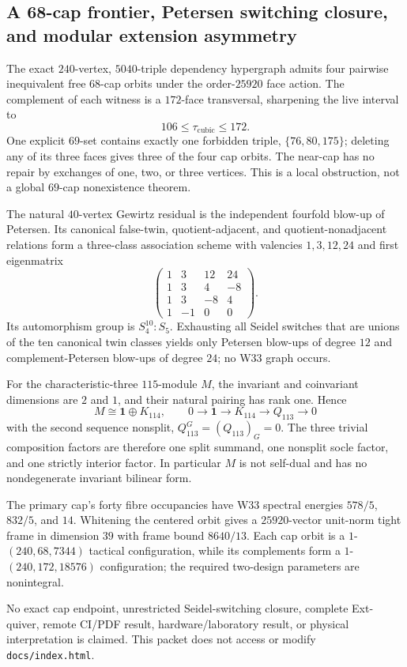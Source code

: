 \subsection{A 68-cap frontier, Petersen switching closure, and modular extension asymmetry}
\label{sec:bt3921-3936}

The exact $240$-vertex, $5040$-triple dependency hypergraph admits four pairwise inequivalent free $68$-cap orbits under the order-$25920$ face action.  The complement of each witness is a $172$-face transversal, sharpening the live interval to
\[
106\leq\tau_{\mathrm{cubic}}\leq172.
\]
One explicit $69$-set contains exactly one forbidden triple, $\{76,80,175\}$; deleting any of its three faces gives three of the four cap orbits.  The near-cap has no repair by exchanges of one, two, or three vertices.  This is a local obstruction, not a global $69$-cap nonexistence theorem.

The natural $40$-vertex Gewirtz residual is the independent fourfold blow-up of Petersen.  Its canonical false-twin, quotient-adjacent, and quotient-nonadjacent relations form a three-class association scheme with valencies $1,3,12,24$ and first eigenmatrix
\[
\begin{pmatrix}
1&3&12&24\\
1&3&4&-8\\
1&3&-8&4\\
1&-1&0&0
\end{pmatrix}.
\]
Its automorphism group is $S_4^{10}:S_5$.  Exhausting all Seidel switches that are unions of the ten canonical twin classes yields only Petersen blow-ups of degree $12$ and complement-Petersen blow-ups of degree $24$; no W33 graph occurs.

For the characteristic-three $115$-module $M$, the invariant and coinvariant dimensions are $2$ and $1$, and their natural pairing has rank one.  Hence
\[
M\cong\mathbf1\oplus K_{114},
\qquad
0\longrightarrow\mathbf1\longrightarrow K_{114}\longrightarrow Q_{113}\longrightarrow0
\]
with the second sequence nonsplit, $Q_{113}^G=(Q_{113})_G=0$.  The three trivial composition factors are therefore one split summand, one nonsplit socle factor, and one strictly interior factor.  In particular $M$ is not self-dual and has no nondegenerate invariant bilinear form.

The primary cap's forty fibre occupancies have W33 spectral energies $578/5$, $832/5$, and $14$.  Whitening the centered orbit gives a $25920$-vector unit-norm tight frame in dimension $39$ with frame bound $8640/13$.  Each cap orbit is a $1$-$(240,68,7344)$ tactical configuration, while its complements form a $1$-$(240,172,18576)$ configuration; the required two-design parameters are nonintegral.

No exact cap endpoint, unrestricted Seidel-switching closure, complete Ext-quiver, remote CI/PDF result, hardware/laboratory result, or physical interpretation is claimed.  This packet does not access or modify \texttt{docs/index.html}.
